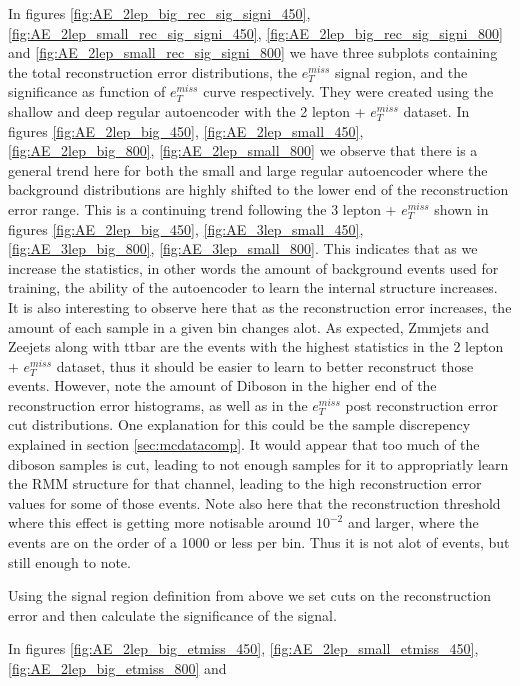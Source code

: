 In figures \ref{fig:AE_2lep_big_rec_sig_signi_450}, \ref{fig:AE_2lep_small_rec_sig_signi_450}, 
\ref{fig:AE_2lep_big_rec_sig_signi_800} and \ref{fig:AE_2lep_small_rec_sig_signi_800} we have three 
subplots containing the total reconstruction error distributions, the $e_T^{miss}$ signal region, 
and the significance as function of $e_T^{miss}$ curve respectively. They were created using 
the shallow and deep regular autoencoder with the 2 lepton + $e_T^{miss}$ dataset.
In figures \ref{fig:AE_2lep_big_450}, \ref{fig:AE_2lep_small_450}, \ref{fig:AE_2lep_big_800}, 
\ref{fig:AE_2lep_small_800} we observe that there is a general trend here for both the small 
and large regular autoencoder where the background distributions are highly shifted to the 
lower end of the reconstruction error range. This is a continuing trend following the 3 
lepton + $e_T^{miss}$ shown in figures \ref{fig:AE_2lep_big_450}, \ref{fig:AE_3lep_small_450},
\ref{fig:AE_3lep_big_800}, \ref{fig:AE_3lep_small_800}. 
This indicates that as we increase the statistics, in other words the amount of background events 
used for training, the ability of the autoencoder to learn the internal structure increases. 
It is also interesting to observe here that as the reconstruction error increases, the amount 
of each sample in a given bin changes alot. As expected, Zmmjets and Zeejets along with ttbar 
are the events with the highest statistics in the 2 lepton + $e_T^{miss}$ dataset, thus it 
should be easier to learn to better reconstruct those events. However, note the amount of 
Diboson in the higher end of the reconstruction error histograms, as well as in the $e_T^{miss}$ 
post reconstruction error cut distributions. One explanation for this could be the sample 
discrepency explained in section \ref{sec:mcdatacomp}. It would appear that too much of the 
diboson samples is cut, leading to not enough samples for it to appropriatly learn the RMM 
structure for that channel, leading to the high reconstruction error values for some of 
those events. Note also here that the reconstruction threshold where this effect is getting 
more notisable around $10^{-2}$ and larger, where the events are on the order of a 1000 or 
less per bin. Thus it is not alot of events, but still enough to note. \par Using the signal 
region definition from above we set cuts on the reconstruction error and then calculate the 
significance of the signal. \par
In figures \ref{fig:AE_2lep_big_etmiss_450}, \ref{fig:AE_2lep_small_etmiss_450}, \ref{fig:AE_2lep_big_etmiss_800} and  
